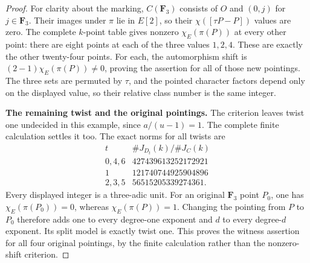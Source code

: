 \begin{proof}
For clarity about the marking, $C(\mathbf F_3)$ consists of
$O$ and $(0,j)$ for $j\in\mathbf F_3$.
Their images under $\pi$ lie in $E[2]$, so their
$\chi([\tau P-P])$ values are zero.
The complete $k$-point table gives nonzero
$\chi_E(\pi(P))$ at every other point: there are eight
points at each of the three values $1,2,4$.
These are exactly the other twenty-four points.
For each, the automorphism shift is
$(2-1)\chi_E(\pi(P))\ne0$, proving the assertion for
all of those new pointings.
The three sets are permuted by $\tau$, and the pointed
character factors depend only on the displayed value,
so their relative class number is the same integer.

\medskip\noindent\textbf{The remaining twist and the original pointings.}
The criterion leaves twist one undecided in this example,
since $a/(u-1)=1$.
The complete finite calculation settles it too.
The exact norms for all twists are
\[
\begin{array}{c|r}
 t & \#J_{D_t}(k)/\#J_C(k)\\ \hline
 0,4,6&427439613252172921\\
 1&121740744925904896\\
 2,3,5&56515205339274361 .
\end{array}                                                  \tag{B.145.14}
\]
Every displayed integer is a three-adic unit.
For an original $\mathbf F_3$ point $P_0$, one has
$\chi_E(\pi(P_0))=0$, whereas $\chi_E(\pi(P))=1$.
Changing the pointing from $P$ to $P_0$ therefore adds one
to every degree-one exponent and $d$ to every degree-$d$
exponent.  Its split model is exactly twist one.
This proves the witness assertion for all four original
pointings, by the finite calculation rather than the
nonzero-shift criterion.


\end{proof}
